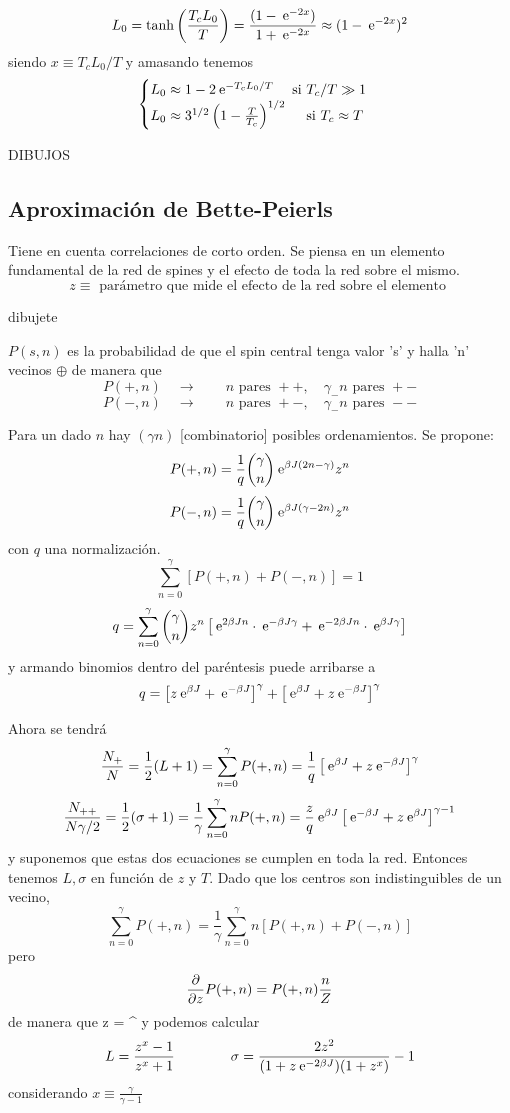 \documentclass[10pt,oneside]{CBFT_book}
\begin{document}
\[
	L_0 = \tanh\left( \frac{ T_c L_0 }{ T } \right) = \frac{(1-\:\mathrm{e}^{-2x})}{1+\:\mathrm{e}^{-2x}}
	\approx (1-\:\mathrm{e}^{-2x})^2
\]
siendo $x\equiv T_cL_0/T$ y amasando tenemos
\[
	\begin{cases}
	L_0 \approx 1 - 2\:\mathrm{e}^{-T_cL_0/T} \quad \text{ si } T_c/T \gg 1 \\
	L_0 \approx 3^{1/2}\left( 1 - \frac{T}{T_c} \right)^{1/2} \quad \text{ si } T_c \approx T 
	\end{cases}
\]	


DIBUJOS

\subsection{Aproximación de Bette-Peierls}

Tiene en cuenta correlaciones de corto orden. Se piensa en un elemento fundamental de la red de spines y el
efecto de toda la red sobre el mismo.
\[
	z \equiv \text{ parámetro que mide el efecto de la red sobre el elemento }
\]

dibujete

$P(s,n)$ es la probabilidad de que el spin central tenga valor 's' y halla 'n' vecinos $\oplus$
de manera que 
\[
	P(+,n) \quad \rightarrow \qquad n \text{ pares } ++, \quad \gamma_- n \text{ pares } +- 
\]
\[
	P(-,n) \quad \rightarrow \qquad n \text{ pares } +-, \quad \gamma_- n \text{ pares } -- 
\]

Para un dado $n$ hay $(\gamma n)$ [combinatorio] posibles ordenamientos.
Se propone:
\[
	P(+,n) = \frac{1}{q}\binom{\gamma}{n} \:\mathrm{e}^{\beta J (2n-\gamma)} z^n
\]
\[
	P(-,n) = \frac{1}{q}\binom{\gamma}{n} \:\mathrm{e}^{\beta J (\gamma-2n)} z^n
\]
con $q$ una normalización.
\[
	\sum_{n=0}^\gamma [ P(+,n) + P(-,n) ] = 1
\]
\[
	q = \sum_{n=0}^\gamma \binom{\gamma}{n} z^n 
	\left[ \:\mathrm{e}^{2\beta J n} \cdot \:\mathrm{e}^{-\beta J \gamma} + 
	\:\mathrm{e}^{-2\beta J n} \cdot \:\mathrm{e}^{\beta J \gamma} \right]
\]
y armando binomios dentro del paréntesis puede arribarse a
\[
	q = \left[ z\:\mathrm{e}^{\beta J} + \:\mathrm{e}^{-\beta J} \right]^\gamma +
	\left[ \:\mathrm{e}^{\beta J} + z\:\mathrm{e}^{-\beta J} \right]^\gamma
\]

Ahora se tendrá
\[
	\frac{N_+}{N} = \frac{1}{2}(L+1) = \sum_{n=0}^\gamma P(+,n) =
	\frac{1}{q} \left[ \:\mathrm{e}^{\beta J} + z\:\mathrm{e}^{-\beta J} \right]^\gamma
\]
\[
	\frac{N_{++}}{N\gamma/2} = \frac{1}{2}(\sigma+1) = \frac{1}{\gamma} \sum_{n=0}^\gamma n P(+,n) =
	\frac{z}{q} \:\mathrm{e}^{\beta J} \left[ \:\mathrm{e}^{-\beta J} + z\:\mathrm{e}^{\beta J} \right]^{\gamma-1}
\]
y suponemos que estas dos ecuaciones se cumplen en toda la red.
Entonces tenemos $L,\sigma$ en función de $z$ y $T$.
Dado que los centros son indistinguibles de un vecino,
\[
	\sum_{n=0}^\gamma P(+,n) = \frac{1}{\gamma} \sum_{n=0}^\gamma n \left[ P(+,n) + P(-,n) \right]
\]
pero
\[
	\frac{\partial^{\hspace{-0.05em}} {}}{\partial {z}^{\hspace{-0.05em}}}P(+,n) = P(+,n)\frac{n}{Z}
\]
de manera que 
\be
	z = ^{}
	\label{z_equation}
\ee
y podemos calcular
\[
	L = \frac{z^x - 1}{z^x + 1} \qquad \qquad \sigma = \frac{2z^2}{(1+z\:\mathrm{e}^{-2\beta J})(1+z^x)} -1
\]
considerando $x\equiv \frac{\gamma}{\gamma -1}$
\end{document}
